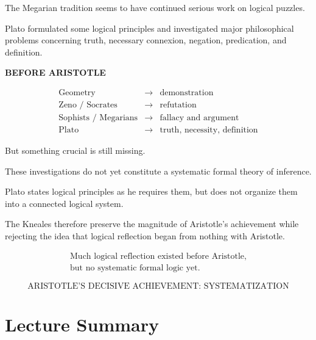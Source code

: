 \documentclass[11pt]{article}
\begin{document}
The Megarian tradition seems to have continued serious work on
logical puzzles.

Plato formulated some logical principles and investigated major
philosophical problems concerning truth, necessary connexion,
negation, predication, and definition.

\begin{whiteboard}
\textbf{BEFORE ARISTOTLE}

\[
\begin{array}{rcl}
\text{Geometry}
&\longrightarrow&
\text{demonstration}
\\[0.4em]
\text{Zeno / Socrates}
&\longrightarrow&
\text{refutation}
\\[0.4em]
\text{Sophists / Megarians}
&\longrightarrow&
\text{fallacy and argument}
\\[0.4em]
\text{Plato}
&\longrightarrow&
\text{truth, necessity, definition}
\end{array}
\]
\end{whiteboard}

But something crucial is still missing.

These investigations do not yet constitute a systematic formal
theory of inference.

Plato states logical principles as he requires them, but does not
organize them into a connected logical system.

The Kneales therefore preserve the magnitude of Aristotle's
achievement while rejecting the idea that logical reflection
began from nothing with Aristotle.

\begin{whiteboard}
\[
\boxed{
\begin{array}{c}
\text{Much logical reflection existed before Aristotle,}\\
\text{but no systematic formal logic yet.}
\end{array}
}
\]

\vspace{0.6em}

\[
\boxed{
\text{ARISTOTLE'S DECISIVE ACHIEVEMENT: SYSTEMATIZATION}
}
\]
\end{whiteboard}

\section{Lecture Summary}
\end{document}
